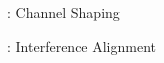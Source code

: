 

\begin{section}{}
	\begin{subsection}{: Channel Shaping}

	\end{subsection}

	\begin{subsection}{: Interference Alignment}

	\end{subsection}
\end{section}
